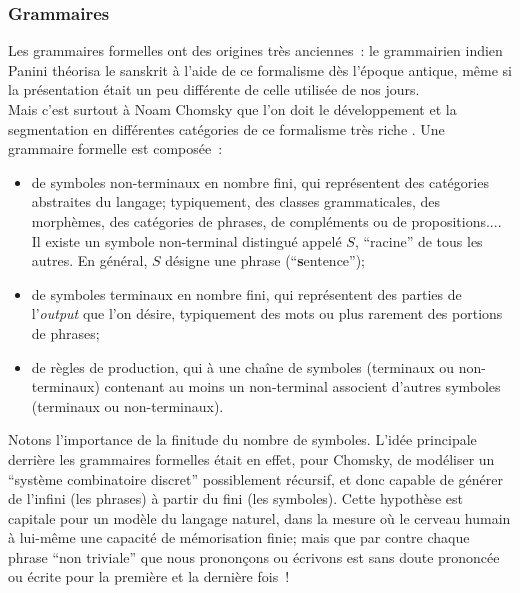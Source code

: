 \documentclass{article}
\begin{document}
			\subsubsection{Grammaires}\label{grammaires}
				Les grammaires formelles ont des origines très anciennes~: le grammairien indien Panini théorisa le sanskrit à l'aide de ce formalisme dès l'époque antique, même si la présentation était un peu différente de celle utilisée de nos jours.\\
				Mais c'est surtout à Noam Chomsky que l'on doit le développement et la segmentation en différentes catégories de ce formalisme très riche \cite{chomsky1956}. Une grammaire formelle est composée~:
				\vspace{2mm}
				\begin{itemize}
					\item de symboles non-terminaux en nombre fini, qui représentent des catégories abstraites du langage; typiquement, des classes grammaticales, des morphèmes, des catégories de phrases, de compléments ou de propositions.... Il existe un symbole non-terminal distingué appelé $S$, ``racine'' de tous les autres. En général, $S$ désigne une phrase (``\textbf{s}entence'');
					\item de symboles terminaux en nombre fini, qui représentent des parties de l'\textit{output} que l'on désire, typiquement des mots ou plus rarement des portions de phrases;
					\item de règles de production, qui à une chaîne de symboles (terminaux ou non-terminaux) contenant au moins un non-terminal associent d'autres symboles (terminaux ou non-terminaux).
				\end{itemize}
				\vspace{2mm}
				Notons l'importance de la finitude du nombre de symboles. L'idée principale derrière les grammaires formelles était en effet, pour Chomsky, de modéliser un ``système combinatoire discret'' possiblement récursif, et donc capable de générer de l'infini (les phrases) à partir du fini (les symboles). Cette hypothèse est capitale pour un modèle du langage naturel, dans la mesure où le cerveau humain à lui-même une capacité de mémorisation finie; mais que par contre chaque phrase ``non triviale'' que nous prononçons ou écrivons est sans doute prononcée ou écrite pour la première et la dernière fois~!\\
				
\end{document}
